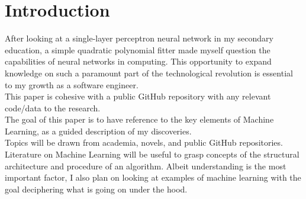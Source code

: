 \section{Introduction}
\label{section:intro}


After looking at a single-layer perceptron neural network in my secondary education, a simple quadratic polynomial fitter made myself question the capabilities of neural networks in computing. This opportunity to expand knowledge on such a paramount part of the technological revolution is essential to my growth as a software engineer. \\

This paper is cohesive with a public GitHub repository with any relevant code/data to the research. \\

The goal of this paper is to have reference to the key elements of Machine Learning, as a guided description of my discoveries. \\

Topics will be drawn from academia, novels, and public GitHub repositories. Literature on Machine Learning will be useful to grasp concepts of the structural architecture and procedure of an algorithm. Albeit understanding is the most important factor, I also plan on looking at examples of machine learning with the goal deciphering what is going on under the hood.
\\